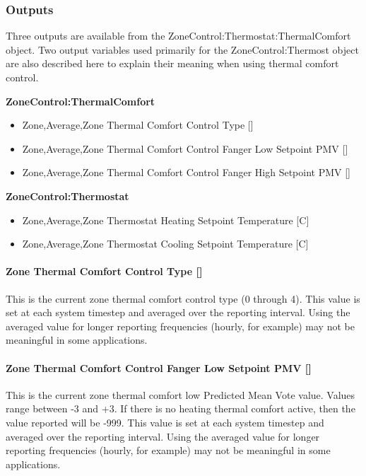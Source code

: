 \subsubsection{Outputs}\label{outputs-3-024}

Three outputs are available from the ZoneControl:Thermostat:ThermalComfort object. Two output variables used primarily for the ZoneControl:Thermost object are also described here to explain their meaning when using thermal comfort control.

\textbf{ZoneControl:ThermalComfort}

\begin{itemize}
\item
  Zone,Average,Zone Thermal Comfort Control Type {[]}
\item
  Zone,Average,Zone Thermal Comfort Control Fanger Low Setpoint PMV {[]}
\item
  Zone,Average,Zone Thermal Comfort Control Fanger High Setpoint PMV {[]}
\end{itemize}

\textbf{ZoneControl:Thermostat}

\begin{itemize}
\item
  Zone,Average,Zone Thermostat Heating Setpoint Temperature {[}C{]}
\item
  Zone,Average,Zone Thermostat Cooling Setpoint Temperature {[}C{]}
\end{itemize}

\paragraph{Zone Thermal Comfort Control Type {[]}}\label{zone-thermal-comfort-control-type}

This is the current zone thermal comfort control type (0 through 4). This value is set at each system timestep and averaged over the reporting interval. Using the averaged value for longer reporting frequencies (hourly, for example) may not be meaningful in some applications.

\paragraph{Zone Thermal Comfort Control Fanger Low Setpoint PMV {[]}}\label{zone-thermal-comfort-control-fanger-low-setpoint-pmv}

This is the current zone thermal comfort low Predicted Mean Vote value. Values range between -3 and +3. If there is no heating thermal comfort active, then the value reported will be -999. This value is set at each system timestep and averaged over the reporting interval. Using the averaged value for longer reporting frequencies (hourly, for example) may not be meaningful in some applications.

